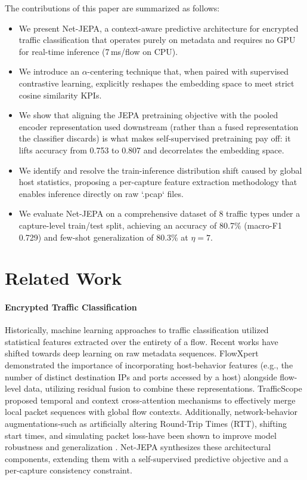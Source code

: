\documentclass{article}
\begin{document}
The contributions of this paper are summarized as follows:
\begin{itemize}
    \item We present Net-JEPA, a context-aware predictive architecture for encrypted traffic classification that operates purely on metadata and requires no GPU for real-time inference (7\,ms/flow on CPU).
    \item We introduce an $\alpha$-centering technique that, when paired with supervised contrastive learning, explicitly reshapes the embedding space to meet strict cosine similarity KPIs.
    \item We show that aligning the JEPA pretraining objective with the pooled encoder representation used downstream (rather than a fused representation the classifier discards) is what makes self-supervised pretraining pay off: it lifts accuracy from 0.753 to 0.807 and decorrelates the embedding space.
    \item We identify and resolve the train-inference distribution shift caused by global host statistics, proposing a per-capture feature extraction methodology that enables inference directly on raw `.pcap` files.
    \item We evaluate Net-JEPA on a comprehensive dataset of 8 traffic types under a capture-level train/test split, achieving an accuracy of 80.7\% (macro-F1 0.729) and few-shot generalization of 80.3\% at $\eta=7$.
\end{itemize}

\section{Related Work}

\paragraph{Encrypted Traffic Classification}
Historically, machine learning approaches to traffic classification utilized statistical features extracted over the entirety of a flow. Recent works have shifted towards deep learning on raw metadata sequences. FlowXpert \cite{zha2025flowxpert} demonstrated the importance of incorporating host-behavior features (e.g., the number of distinct destination IPs and ports accessed by a host) alongside flow-level data, utilizing residual fusion to combine these representations. TrafficScope \cite{zhao2025trafficscope} proposed temporal and context cross-attention mechanisms to effectively merge local packet sequences with global flow contexts. Additionally, network-behavior augmentations-such as artificially altering Round-Trip Times (RTT), shifting start times, and simulating packet loss-have been shown to improve model robustness and generalization \cite{horowicz2024}. Net-JEPA synthesizes these architectural components, extending them with a self-supervised predictive objective and a per-capture consistency constraint.
\end{document}
